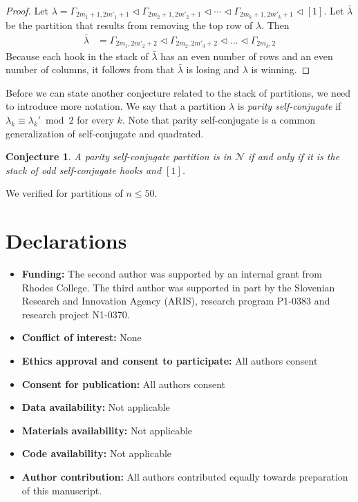 \documentclass[pdflatex,sn-mathphys-num]{sn-jnl}%
\theoremstyle{thmstyleone}%
\theoremstyle{thmstyletwo}%
\theoremstyle{thmstylethree}%
\newtheorem{conj}{Conjecture}
\newcommand{\n}{\mathcal N}
\begin{document}
\begin{proof} 
    Let $\lambda = \Gamma_{2m_1+1, 2m'_1 + 1} \lhd \Gamma_{2m_2+1, 2m'_2+1} \lhd \cdots \lhd \Gamma_{2m_k+1, 2m'_k+1} \lhd [1]$. 
    Let $\bar \lambda$ be the partition that results from removing the top row of $\lambda$. Then 
\begin{align*}
\bar \lambda &= \Gamma_{2m_1, 2m'_2+2} \lhd \Gamma_{2m_2, 2m'_3+2} \lhd\dots\lhd \Gamma_{2m_k, 2}
\end{align*}
    Because each hook in the stack of $\bar \lambda$ has an even number of rows and an even number of columns, it follows from  that $\bar \lambda$ is losing and $\lambda$ is winning. \qedhere
\end{proof}



Before we can state another conjecture related to the stack of partitions, we need to introduce more notation.
%
We say that a partition $\lambda$ is \emph{parity self-conjugate} if $\lambda_k \equiv \lambda_k' \bmod 2$ for every $k$. Note that parity self-conjugate is a common generalization of self-conjugate and quadrated. 

\begin{conj}
\label{conj:pself}
    A parity self-conjugate partition is in $\n$ if and only if it is the stack of odd self-conjugate hooks and $[1]$. 
\end{conj}


We verified  for partitions of $n \le 50$.



\backmatter
\vfill
\section*{Declarations}



\begin{itemize}
\item \textbf{Funding:}
The second author was supported by an internal grant from Rhodes College.
The third author was supported in part by the Slovenian Research and Innovation Agency (ARIS), research program P1-0383 and research project N1-0370.
\item \textbf{Conflict of interest:}
None
\item \textbf{Ethics approval and consent to participate:}
All authors consent
\item \textbf{Consent for publication:}
All authors consent
\item \textbf{Data availability:} 
Not applicable
\item \textbf{Materials availability:}
Not applicable
\item \textbf{Code availability:} 
Not applicable
\item \textbf{Author contribution:}
All authors contributed equally towards preparation of this manuscript.
\end{itemize} 
\end{document}
